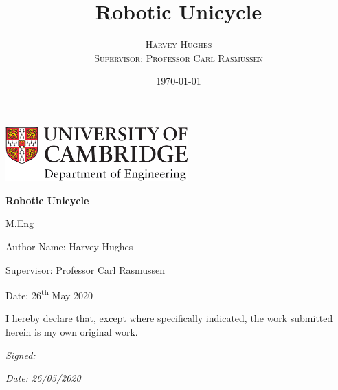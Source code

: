 \documentclass[twoside,twocolumn,12pt]{article}
\title{Robotic Unicycle} %
\author{%
\textsc{Harvey Hughes} \\
\textsc{Supervisor: Professor Carl Rasmussen} \\
}
\date{\today} %
\begin{document}
\onecolumn
\thispagestyle{empty}
\begin{flushleft}
 \includegraphics[width=7cm]{Engineering}\par
\end{flushleft}
\vspace{4cm}
\begin{flushright}
 {\huge\bfseries Robotic Unicycle\par}
 \vspace{0.5cm}
 {\Large M.Eng}\par
 \vspace{4cm}
 {\small Author Name: Harvey Hughes\par
 Supervisor: Professor Carl Rasmussen\par
 \vspace{1cm}
 Date: 26\textsuperscript{th} May 2020}
\end{flushright}
\vfill
 
{\footnotesize \noindent I hereby declare that, except where specifically indicated, the work submitted herein is my own original work.}\par
\vspace{0.5cm}
\begin{minipage}[t]{0.5\linewidth}
{\small\textit{Signed: }\hrulefill}
\end{minipage}
\hfill
\begin{minipage}[t]{0.3\linewidth}
{\small\textit{Date: 26/05/2020}}
\end{minipage}
\end{document}
